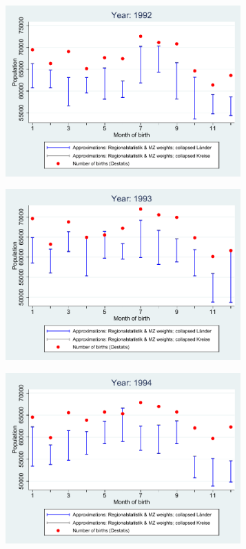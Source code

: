 \documentclass[a4paper ]{article}
\begin{document}
\begin{figure}[h]
\begin{subfigure}[t]{0.48\textwidth}
		\includegraphics[width=0.99\textwidth]{comparison_population_1992.pdf}		
\end{subfigure}
\begin{subfigure}[t]{0.48\textwidth}
		\centering
		\includegraphics[width=0.99\textwidth]{comparison_population_1993.pdf}		
\end{subfigure}
\begin{subfigure}[t]{0.48\textwidth}
		\centering
		\includegraphics[width=0.99\textwidth]{comparison_population_1994.pdf}		

\end{subfigure}
\end{figure}
\end{document}

